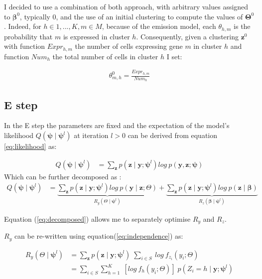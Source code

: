I decided to use a combination of both approach, with arbitrary values assigned to $\boldsymbol{\beta}^{0}$, typically $0$, and the use of an initial clustering to compute the values of $\boldsymbol{\Theta}^{0}$. Indeed, for $h \in {1,...,K}, m \in M$, because of the emission model, each $\theta_{h,m}$ is the probability that $m$ is expressed in cluster $h$. Consequently, given a clustering $\boldsymbol{z}^{0}$ with function $Expr_{h,m}$ the number of cells expressing gene $m$ in cluster $h$ and function $Num_h$ the total number of cells in cluster $h$ I set:

\begin{align*}
\theta_{m,h}^{0} = \frac{Expr_{h,m}}{Num_h}
\end{align*}

	\subsection{E step}

In the E step the parameters are fixed and the expectation of the model's likelihood $Q(\boldsymbol{\psi} \mid \boldsymbol{\psi}^{l})$ at iteration $l > 0$ can be derived from equation \ref{eq:likelihood} as:

\begin{align}
Q(\boldsymbol{\psi} \mid \boldsymbol{\psi}^{l}) &= \sum\limits_{\boldsymbol{z}} p(\boldsymbol{z} \mid \boldsymbol{y} ; \boldsymbol{\psi}^{l}) log\:p(\boldsymbol{y},\boldsymbol{z};\boldsymbol{\psi}) \nonumber
\end{align}
Which can be further decomposed as :
\begin{align}
\label{eq:decomposed}
Q(\boldsymbol{\psi} \mid \boldsymbol{\psi}^{l}) &= \underbrace{\sum\limits_{\boldsymbol{z}} p(\boldsymbol{z} \mid \boldsymbol{y} ; \boldsymbol{\psi}^{l}) log\:p(\boldsymbol{y} \mid \boldsymbol{z} ; \Theta)}_{R_y(\Theta\mid \boldsymbol{\psi}^l)} 
 + \underbrace{\sum\limits_{\boldsymbol{z}} p(\boldsymbol{z} \mid \boldsymbol{y} ; \boldsymbol{\psi}^{l}) log\:p(\boldsymbol{z} \mid \boldsymbol{\beta})}_{R_z(\boldsymbol{\beta}\mid \boldsymbol{\psi}^l)}
\end{align}

Equation (\ref{eq:decomposed}) allows me to separately optimise $R_y$ and $R_z$.


$R_y$ can be re-written using equation(\ref{eq:independence}) as:

\begin{align*}
R_y(\Theta\mid \boldsymbol{\psi}^l) &= \sum\limits_{\boldsymbol{z}} p(\boldsymbol{z}\mid \boldsymbol{y} ; \boldsymbol{\psi}^{l})\;\sum\limits_{i \in S}\: log\: f_{z_i} (y_i ; \Theta)\\
&= \sum\limits_{i \in S} \sum\limits_{h=1}^{K}\; \left[log\: f_{h} (y_i  ; \Theta) \right] \; p(Z_i = h \mid \boldsymbol{y};\boldsymbol{\psi}^{l})
\end{align*}  

